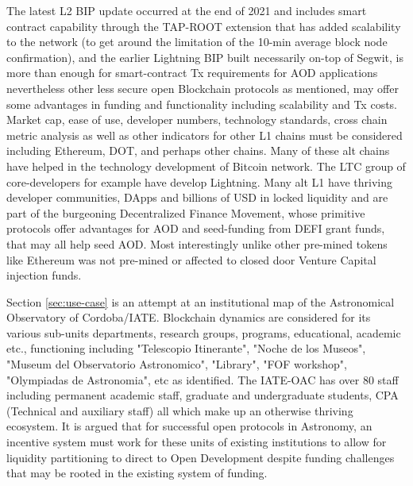 \documentclass[final,5p,times,twocolumn,authoryear]{elsarticle}
\begin{document}
The latest L2 BIP update occurred at the end of 2021 and includes smart contract capability through the TAP-ROOT extension that has added scalability to the network (to get around the limitation of the 10-min average block node confirmation), and the earlier Lightning BIP built necessarily on-top of Segwit, is more than enough for smart-contract Tx requirements for AOD applications nevertheless other less secure open Blockchain protocols as mentioned, may offer some advantages in funding and functionality including scalability and Tx costs. Market cap, ease of use, developer numbers, technology standards, cross chain metric analysis as well as other indicators for other L1 chains must be considered including Ethereum, DOT, and perhaps other chains. Many of these alt chains have helped in the technology development of Bitcoin network. The LTC group of core-developers for example have develop Lightning. Many alt L1 have thriving developer communities, DApps and billions of USD in locked liquidity and are part of the burgeoning Decentralized Finance Movement, whose primitive protocols offer advantages for AOD and seed-funding from DEFI grant funds, that may all help seed AOD. Most interestingly unlike other pre-mined tokens like Ethereum was not pre-mined or affected to closed door Venture Capital injection funds. 

Section \ref{sec:use-case} is an attempt at an institutional map of the Astronomical Observatory of Cordoba/IATE. Blockchain dynamics are considered for its various sub-units departments, research groups, programs, educational, academic etc., functioning including "Telescopio Itinerante", "Noche de los Museos", "Museum del Observatorio Astronomico", "Library", "FOF workshop", "Olympiadas de Astronomia", etc as identified. The IATE-OAC has over 80 staff including permanent academic staff, graduate and undergraduate students,  CPA (Technical and auxiliary staff) all which make up an otherwise thriving ecosystem. It is argued that for successful open protocols in Astronomy, an incentive system must work for these units of existing institutions to allow for liquidity partitioning to direct to Open Development despite funding challenges that may be rooted in the existing system of funding.
\end{document}

